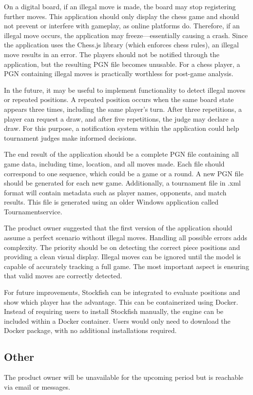 On a digital board, if an illegal move is made, the board may stop registering further moves. This application should only display the chess game and should not prevent or interfere with gameplay, as online platforms do. Therefore, if an illegal move occurs, the application may freeze—essentially causing a crash. Since the application uses the Chess.js library (which enforces chess rules), an illegal move results in an error. The players should not be notified through the application, but the resulting PGN file becomes unusable. For a chess player, a PGN containing illegal moves is practically worthless for post-game analysis.

In the future, it may be useful to implement functionality to detect illegal moves or repeated positions. A repeated position occurs when the same board state appears three times, including the same player's turn. After three repetitions, a player can request a draw, and after five repetitions, the judge may declare a draw. For this purpose, a notification system within the application could help tournament judges make informed decisions.

The end result of the application should be a complete PGN file containing all game data, including time, location, and all moves made. Each file should correspond to one sequence, which could be a game or a round. A new PGN file should be generated for each new game. Additionally, a tournament file in .xml format will contain metadata such as player names, opponents, and match results. This file is generated using an older Windows application called Tournamentservice.

The product owner suggested that the first version of the application should assume a perfect scenario without illegal moves. Handling all possible errors adds complexity. The priority should be on detecting the correct piece positions and providing a clean visual display. Illegal moves can be ignored until the model is capable of accurately tracking a full game. The most important aspect is ensuring that valid moves are correctly detected.

For future improvements, Stockfish can be integrated to evaluate positions and show which player has the advantage. This can be containerized using Docker. Instead of requiring users to install Stockfish manually, the engine can be included within a Docker container. Users would only need to download the Docker package, with no additional installations required.

\subsection{Other} 
The product owner will be unavailable for the upcoming period but is reachable via email or messages.
